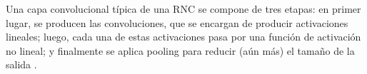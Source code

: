\documentclass[../../main.tex]{subfiles}
\begin{document}
Una capa convolucional típica de una RNC se compone de tres etapas: en primer lugar, se
producen las convoluciones, que se encargan de producir activaciones lineales; luego, cada
una de estas activaciones pasa por una función de activación no lineal; y finalmente se
aplica pooling para reducir (aún más) el tamaño de la salida \cite{deep-learning}.


\end{document}
